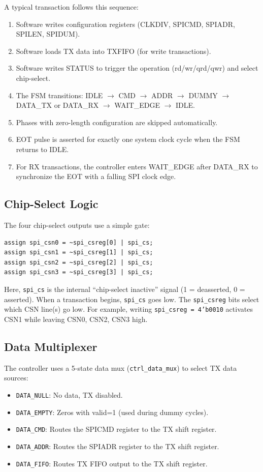 A typical transaction follows this sequence:
\begin{enumerate}[leftmargin=2em]
  \item Software writes configuration registers (CLKDIV, SPICMD, SPIADR, SPILEN, SPIDUM).
  \item Software loads TX data into TXFIFO (for write transactions).
  \item Software writes STATUS to trigger the operation (rd/wr/qrd/qwr) and select chip-select.
  \item The FSM transitions: IDLE $\rightarrow$ CMD $\rightarrow$ ADDR $\rightarrow$ DUMMY $\rightarrow$
        DATA\_TX or DATA\_RX $\rightarrow$ WAIT\_EDGE $\rightarrow$ IDLE.
  \item Phases with zero-length configuration are skipped automatically.
  \item EOT pulse is asserted for exactly one system clock cycle when the FSM returns to IDLE.
  \item For RX transactions, the controller enters WAIT\_EDGE after DATA\_RX to synchronize the
        EOT with a falling SPI clock edge.
\end{enumerate}

\subsection{Chip-Select Logic}

The four chip-select outputs use a simple gate:
\begin{lstlisting}
assign spi_csn0 = ~spi_csreg[0] | spi_cs;
assign spi_csn1 = ~spi_csreg[1] | spi_cs;
assign spi_csn2 = ~spi_csreg[2] | spi_cs;
assign spi_csn3 = ~spi_csreg[3] | spi_cs;
\end{lstlisting}
Here, \texttt{spi\_cs} is the internal ``chip-select inactive'' signal (1 = deasserted, 0 = asserted).
When a transaction begins, \texttt{spi\_cs} goes low. The \texttt{spi\_csreg} bits select which
CSN line(s) go low. For example, writing \texttt{spi\_csreg = 4'b0010} activates CSN1 while
leaving CSN0, CSN2, CSN3 high.

\subsection{Data Multiplexer}

The controller uses a 5-state data mux (\texttt{ctrl\_data\_mux}) to select TX data sources:
\begin{itemize}[leftmargin=2em]
  \item \texttt{DATA\_NULL}: No data, TX disabled.
  \item \texttt{DATA\_EMPTY}: Zeros with valid=1 (used during dummy cycles).
  \item \texttt{DATA\_CMD}: Routes the SPICMD register to the TX shift register.
  \item \texttt{DATA\_ADDR}: Routes the SPIADR register to the TX shift register.
  \item \texttt{DATA\_FIFO}: Routes TX FIFO output to the TX shift register.
\end{itemize}

